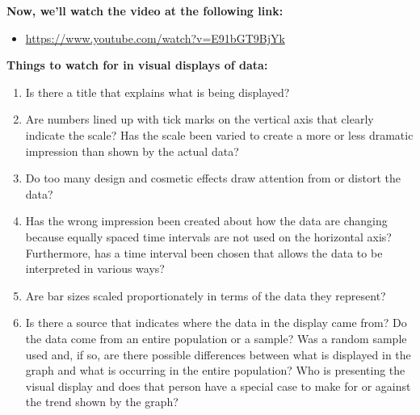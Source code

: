 \documentclass[12pt, letterpaper]{article}
\theoremstyle{definition}
\begin{document}
\bigskip

\noindent\textbf{Now, we'll watch the video at the following link:}

\begin{itemize}

\item \href{https://www.youtube.com/watch?v=E91bGT9BjYk}{https://www.youtube.com/watch?v=E91bGT9BjYk}


\end{itemize}

\bigskip

\begin{tcolorbox}
\textbf{Things to watch for in visual displays of data:}
\begin{enumerate}
\item Is there a title that explains what is being displayed?
\item Are numbers lined up with tick marks on the vertical axis that clearly indicate the scale?  Has the scale been varied to create a more or less dramatic impression than shown by the actual data?
\item Do too many design and cosmetic effects draw attention from or distort the data?
\item Has the wrong impression been created about how the data are changing because equally spaced time intervals are not used on the horizontal axis?  Furthermore, has a time interval been chosen that allows the data to be interpreted in various ways?
\item Are bar sizes scaled proportionately in terms of the data they represent?
\item Is there a source that indicates where the data in the display came from?  Do the data come from an entire population or a sample?  Was a random sample used and, if so, are there possible differences between what is displayed in the graph and what is occurring in the entire population?  Who is presenting the visual display and does that person have a special case to make for or against the trend shown by the graph?
\end{enumerate}
\end{tcolorbox}
\end{document}
